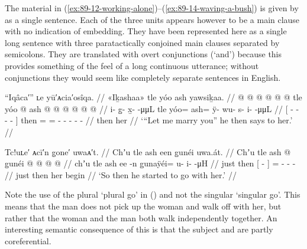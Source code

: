 The material in (\ref{ex:89-12-working-alone})–(\ref{ex:89-14-waving-a-bush}) is given by \citeauthor{swanton:1909} as a single sentence.
Each of the three units appears however to be a main clause with no indication of embedding.
They have been represented here as a single long sentence with three paratactically conjoined main clauses separated by semicolons.
They are translated with overt conjunctions (‘and’) because this provides something of the feel of a long continuous utterance; without conjunctions they would seem like completely separate sentences in English.

\ex\label{ex:89-15-lemme-marry-you-he-says}%
%
\begingl
	\glpreamble	“Iqâca′” ʟe yū′ᴀcia′osîqa. //
	\glpreamble	«\!Iḵashaa\!» tle yóo ash yawsiḵaa. //
	\gla	{}  @ {} @ {} @ {} @ {} @ {} @ {} {}
		tle yóo @ ash @  @ {} @ {} @ {} @ {} @ {} //
	\glb	{} i- {} g̱- x̱-  -μμL {} {}
		tle yóo= ash= ÿ- wu- s- i-  -μμL //
	\glc	{}[ - \· - -
			 - \· {}]
		then = = - - - -
			 - //
	\gld	{}  {} {} {} {} {} {} {}
		then  her  {} {} {} {} {} //
	\glft	‘“Let me marry you” he then says to her.’
		//
\endgl
\xe

\ex\label{ex:89-16-he-started-off-with-her}%
%
\begingl
	\glpreamble	Tc!uʟe′ ᴀcī′n g̣one′ uwaᴀ′t. //
	\glpreamble	Chʼu tle ash een g̱unéi uwa.át. //
	\gla	Chʼu tle {} ash  @ {} {}
		g̱unéi @  @ {} @ {} @ {} //
	\glb	chʼu tle {} ash ee -n {}
		g̱unaÿéi= u- i-  -μH //
	\glc	just then {}[   - {}]
		= - -  - //
	\gld	just then {} her  {} {}
		begin  {} {} {} //
	\glft	‘So then he started to go with her.’
		//
\endgl
\xe

Note the use of the plural  ‘plural go’ in (\lastx) and not the singular  ‘singular go’.
This means that the man does not pick up the woman and walk off with her, but rather that the woman and the man both walk independently together.
An interesting semantic consequence of this is that the subject and  are partly coreferential.

